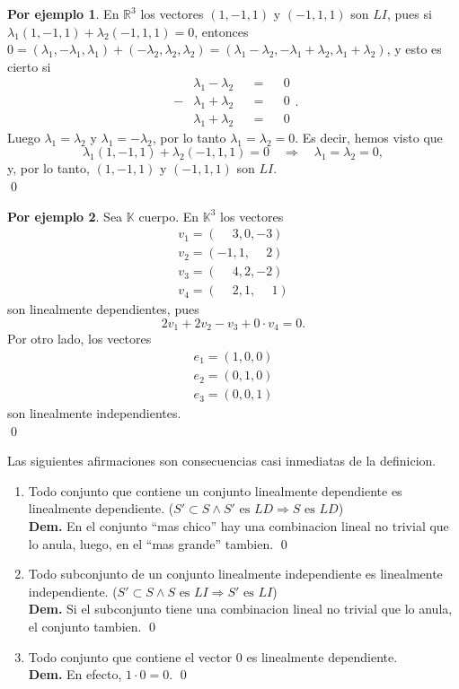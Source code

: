 \documentclass{article}
\theoremstyle{definition}
\theoremstyle{definition}
\newtheorem*{ej}{Por ejemplo}
\theoremstyle{remark}
\begin{document}
\begin{ej}
  En $\mathbb{R}^3$ los vectores $(1,-1,1)$ y $(-1,1,1)$ son $LI$, pues si\\ $\lambda_1(1,-1,1)+\lambda_2 (-1,1,1)=0$, entonces \\$0=(\lambda_1,-\lambda_1,\lambda_1)+(-\lambda_2,\lambda_2,\lambda_2)=(\lambda_1-\lambda_2,-\lambda_1+\lambda_2,\lambda_1+\lambda_2)$, y esto es cierto si \[
    \begin{aligned}
&\lambda_1 -\lambda_2 &&=&& 0 \\ 
      -&\lambda_1 + \lambda_2  &&=&& 0 \\
       &\lambda_1 + \lambda_2 &&=&& 0 
\end{aligned}.
  \]
  Luego $\lambda_1=\lambda_2$ y $\lambda_1=-\lambda_2$, por lo tanto $\lambda_1=\lambda_2=0$. Es decir, hemos visto que \[
\lambda_1(1,-1,1)+\lambda_2(-1,1,1)=0 \quad \Rightarrow \quad \lambda_1=\lambda_2=0,
  \]
  y, por lo tanto, $(1,-1,1)$ y $(-1,1,1)$ son $LI$. \\ \qed
\end{ej}
\begin{ej}
  Sea $\mathbb{K}$ cuerpo. En $\mathbb{K}^3$ los vectores \[
    \begin{aligned}
      v_1=(\phantom{-}3,0,-3) \\
      v_2=(-1,1,\phantom{-}2) \\
      v_3 = (\phantom{-}4,2,-2) \\
      v_4=(\phantom{-}2,1,\phantom{-}1)
    \end{aligned}
  \]
  son linealmente dependientes, pues \[
2v_1+2v_2-v_3+0\cdot v_4 = 0.
  \]
  Por otro lado, los vectores \[
    \begin{aligned}
      e_1=(1,0,0) \\
      e_2 = (0,1,0) \\
      e_3 = (0,0,1) 
    \end{aligned}
  \]
  son linealmente independientes. \\ \qed
\end{ej}
Las siguientes afirmaciones son consecuencias casi inmediatas de la definicion. \begin{enumerate}[label=\arabic*.]
  \item Todo conjunto que contiene un conjunto linealmente dependiente es linealmente dependiente. ($S' \subset S \land S' \text{ es } LD \Rightarrow S \text{ es } LD$)  \\
    \textbf{\textcolor{azulp2}{Dem.}} En el conjunto ``mas chico'' hay una combinacion lineal no trivial que lo anula, luego, en el ``mas grande'' tambien. \qed  
  \item Todo subconjunto de un conjunto linealmente independiente es linealmente independiente. ($S' \subset S \land S \text{ es } LI \Rightarrow S' \text{ es } LI$) 
    \\ \textbf{\textcolor{azulp2}{Dem.}} Si el subconjunto tiene una combinacion lineal no trivial que lo anula, el conjunto tambien. \qed 
  \item Todo conjunto que contiene el vector $0$ es linealmente dependiente. 
    \\ \textcolor{azulp2}{\textbf{Dem.}} En efecto, $1 \cdot 0 = 0$.  \qed
\end{enumerate}
\pagebreak
\end{document}
